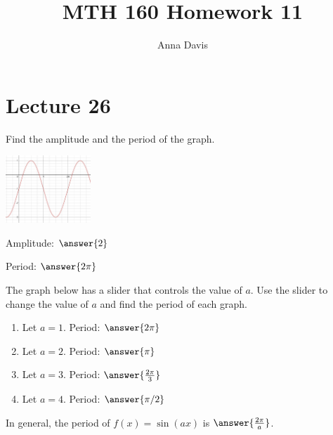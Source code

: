\documentclass{ximera}
\author{Anna Davis} \title{MTH 160 Homework 11}
\begin{document}
\begin{abstract}

\end{abstract}
\maketitle

 \section{Lecture 26}
  \begin{problem}\label{prob:160hom11prob2}
  Find the amplitude and the period of the graph.
  \begin{image}
   
\includegraphics[height=1in]{160H11pic2.jpg}~
 
\end{image}
Amplitude: $\answer{2}$

Period: $\answer{2\pi}$
  \end{problem}
  
 \begin{problem}\label{prob:160hom11prob3}  
 The graph below has a slider that controls the value of $a$.  Use the slider to change the value of $a$ and find the period of each graph.
  \begin{center} 
\end{center}
\begin{enumerate}
    \item Let $a=1$.  Period: $\answer{2\pi}$
    \item Let $a=2$.  Period: $\answer{\pi}$
    \item Let $a=3$.  Period: $\answer{\frac{2\pi}{3}}$
    \item Let $a=4$.  Period: $\answer{\pi/2}$
\end{enumerate}
In general, the period of $f(x)=\sin (ax)$ is $\answer{\frac{2\pi}{a}}$.
\end{problem}
\end{document}
